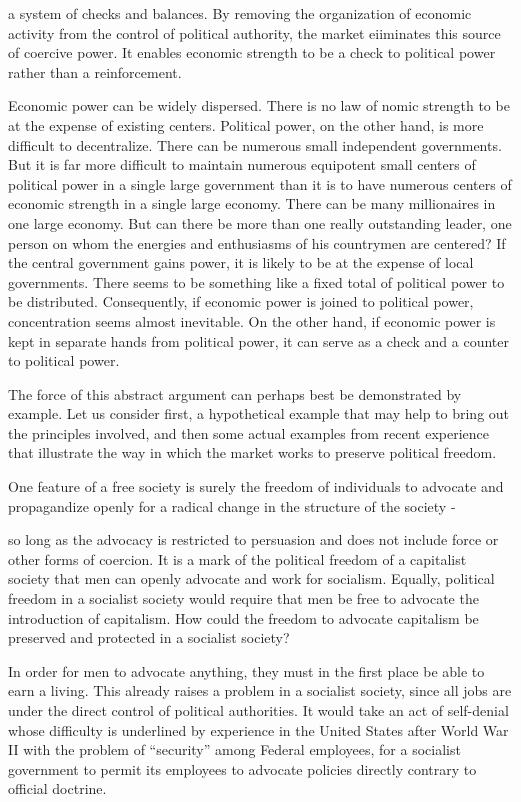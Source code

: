 \documentclass[11pt,openany]{book}
\begin{document}
a system of checks and balances. By removing the organization of economic activity from the control of political authority, the market eiiminates this source of coercive power. It enables economic strength to be a check to political power rather than a reinforcement.

Economic power can be widely dispersed. There is no law of nomic strength to be at the expense of existing centers. Political power, on the other hand, is more difficult to decentralize. There can be numerous small independent governments. But it is far more difficult to maintain numerous equipotent small centers of political power in a single large government than it is to have numerous centers of economic strength in a single large economy. There can be many millionaires in one large economy. But can there be more than one really outstanding leader, one person on whom the energies and enthusiasms of his countrymen are centered? If the central government gains power, it is likely to be at the expense of local governments. There seems to be something like a fixed total of political power to be distributed. Consequently, if economic power is joined to political power, concentration seems almost inevitable. On the other hand, if economic power is kept in separate hands from political power, it can serve as a check and a counter to political power.

The force of this abstract argument can perhaps best be demonstrated by example. Let us consider first, a hypothetical example that may help to bring out the principles involved, and then some actual examples from recent experience that illustrate the way in which the market works to preserve political freedom.

One feature of a free society is surely the freedom of individuals to advocate and propagandize openly for a radical change in the structure of the society -

so long as the advocacy is restricted to persuasion and does not include force or other forms of coercion. It is a mark of the political freedom of a capitalist society that men can openly advocate and work for socialism. Equally, political freedom in a socialist society would require that men be free to advocate the introduction of capitalism. How could the freedom to advocate capitalism be preserved and protected in a socialist society?

In order for men to advocate anything, they must in the first place be able to earn a living. This already raises a problem in a socialist society, since all jobs are under the direct control of political authorities. It would take an act of self-denial whose difficulty is underlined by experience in the United States after World War II with the problem of ``security'' among Federal employees, for a socialist government to permit its employees to advocate policies directly contrary to official doctrine.
\end{document}

